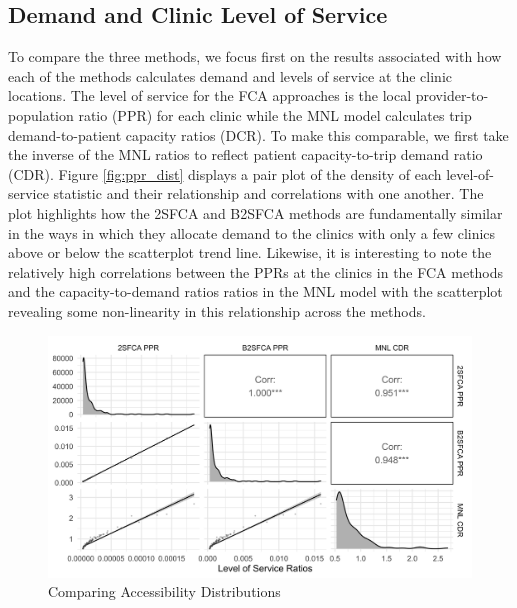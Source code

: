 \documentclass{article}
\begin{document}
\hypertarget{demand-and-clinic-level-of-service}{%
\subsection{Demand and Clinic Level of
Service}\label{demand-and-clinic-level-of-service}}

To compare the three methods, we focus first on the results associated
with how each of the methods calculates demand and levels of service at
the clinic locations. The level of service for the FCA approaches is the
local provider-to-population ratio (PPR) for each clinic while the MNL
model calculates trip demand-to-patient capacity ratios (DCR). To make
this comparable, we first take the inverse of the MNL ratios to reflect
patient capacity-to-trip demand ratio (CDR). Figure \ref{fig:ppr_dist}
displays a pair plot of the density of each level-of-service statistic
and their relationship and correlations with one another. The plot
highlights how the 2SFCA and B2SFCA methods are fundamentally similar in
the ways in which they allocate demand to the clinics with only a few
clinics above or below the scatterplot trend line. Likewise, it is
interesting to note the relatively high correlations between the PPRs at
the clinics in the FCA methods and the capacity-to-demand ratios ratios
in the MNL model with the scatterplot revealing some non-linearity in
this relationship across the methods.

\begin{figure}
\includegraphics[width=1\linewidth]{./img/pair_plot_ppr} \caption{\label{fig:ppr_dist}Comparing Accessibility Distributions}\label{fig:ppr_dist_fig}
\end{figure}
\end{document}
